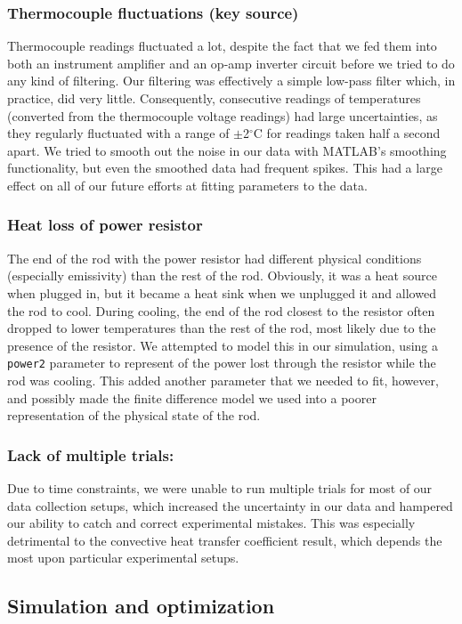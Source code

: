 \documentclass[letterpaper,titlepage,oneside]{report}
\begin{document}
\subsubsection*{Thermocouple fluctuations (key source)}
Thermocouple readings fluctuated a lot, despite the fact that
we fed them into both an instrument amplifier and an op-amp
inverter circuit before we tried to do any kind of filtering.
Our filtering was effectively a simple low-pass filter which,
in practice, did very little. Consequently, consecutive
readings of temperatures (converted from the thermocouple
voltage readings) had large uncertainties, as they regularly
fluctuated with a range of $\pm$2$^{\circ}$C for readings taken
half a second apart. We tried to smooth out the noise in our data
with MATLAB's smoothing functionality, but even the smoothed
data had frequent spikes. This had a large effect on all of
our future efforts at fitting parameters to the data.

\subsubsection* {Heat loss of power resistor}
The end of the rod with the power resistor had different
physical conditions (especially emissivity) than the rest of
the rod. Obviously, it was a heat source when plugged in,
but it became a heat sink when we unplugged it and allowed the rod
to cool. During cooling, the end of the rod closest to the
resistor often dropped to lower temperatures than the rest of
the rod, most likely due to the presence of the resistor.
We attempted to model this in our simulation, using
a \texttt{power2} parameter to represent of the power lost through
the resistor while the rod was cooling. This added another
parameter that we needed to fit, however, and possibly made the
finite difference model we used into a poorer representation of
the physical state of the rod.

\subsubsection* {Lack of multiple trials:}
Due to time constraints, we were unable to run multiple trials
for most of our data collection setups, which increased the
uncertainty in our data and hampered our ability to catch and
correct experimental mistakes. This was especially detrimental
to the convective heat transfer coefficient result,
which depends the most upon particular experimental setups. 

\subsection*{Simulation and optimization}
\end{document}
